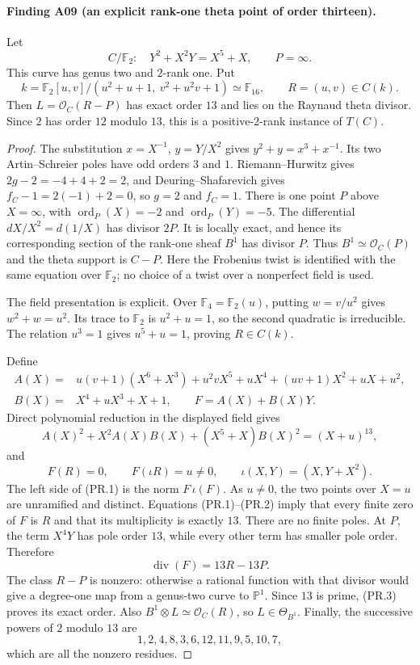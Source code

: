 \paragraph{Finding A09 (an explicit rank-one theta point of order thirteen).}
Let
\[
 C/\mathbb F_2:\quad Y^2+X^2Y=X^5+X,\qquad P=\infty.
\]
This curve has genus two and $2$-rank one. Put
\[
 k=\mathbb F_2[u,v]/(u^2+u+1,\ v^2+u^2v+1)\simeq\mathbb F_{16},
 \qquad R=(u,v)\in C(k).
\]
Then $L=\mathcal O_C(R-P)$ has exact order $13$ and lies on the
Raynaud theta divisor. Since $2$ has order $12$ modulo $13$,
this is a positive-$2$-rank instance of $T(C)$.

\begin{proof}
The substitution $x=X^{-1}$, $y=Y/X^2$ gives
$y^2+y=x^3+x^{-1}$. Its two Artin--Schreier poles have odd orders
$3$ and $1$. Riemann--Hurwitz gives $2g-2=-4+4+2=2$, and
Deuring--Shafarevich gives $f_C-1=2(-1)+2=0$, so $g=2$ and $f_C=1$.
There is one point $P$ above $X=\infty$, with
$\operatorname{ord}_P(X)=-2$ and $\operatorname{ord}_P(Y)=-5$.
The differential $dX/X^2=d(1/X)$ has divisor $2P$.
It is locally exact, and hence its corresponding section of the
rank-one sheaf $B^1$ has divisor $P$. Thus
$B^1\simeq\mathcal O_C(P)$ and the theta support is $C-P$.
Here the Frobenius twist is identified with the same equation over
$\mathbb F_2$; no choice of a twist over a nonperfect field is used.

The field presentation is explicit. Over $\mathbb F_4=\mathbb F_2(u)$,
putting $w=v/u^2$ gives $w^2+w=u^2$. Its trace to $\mathbb F_2$ is
$u^2+u=1$, so the second quadratic is irreducible. The relation
$u^3=1$ gives $u^5+u=1$, proving $R\in C(k)$.

Define
\begin{align*}
 A(X)={}&u(v+1)(X^6+X^3)+u^2vX^5+uX^4
                 +(uv+1)X^2+uX+u^2,\\
 B(X)={}&X^4+uX^3+X+1,\qquad F=A(X)+B(X)Y.
\end{align*}
Direct polynomial reduction in the displayed field gives
\[
 A(X)^2+X^2A(X)B(X)+(X^5+X)B(X)^2=(X+u)^{13},
 \tag{PR.1}
\]
and
\[
 F(R)=0,\qquad F(\iota R)=u\ne0,
 \qquad\iota(X,Y)=(X,Y+X^2).
 \tag{PR.2}
\]
The left side of (PR.1) is the norm $F\,\iota(F)$.
As $u\ne0$, the two points over $X=u$ are unramified and distinct.
Equations (PR.1)--(PR.2) imply that every finite zero of $F$ is $R$
and that its multiplicity is exactly $13$. There are no finite poles.
At $P$, the term $X^4Y$ has pole order $13$, while every other term
has smaller pole order. Therefore
\[
 \operatorname{div}(F)=13R-13P.\tag{PR.3}
\]
The class $R-P$ is nonzero: otherwise a rational function with that
divisor would give a degree-one map from a genus-two curve to
$\mathbb P^1$. Since $13$ is prime, (PR.3) proves its exact order.
Also $B^1\otimes L\simeq\mathcal O_C(R)$, so $L\in\Theta_{B^1}$.
Finally, the successive powers of $2$ modulo $13$ are
\[
 1,2,4,8,3,6,12,11,9,5,10,7,
\]
which are all the nonzero residues.
\end{proof}

